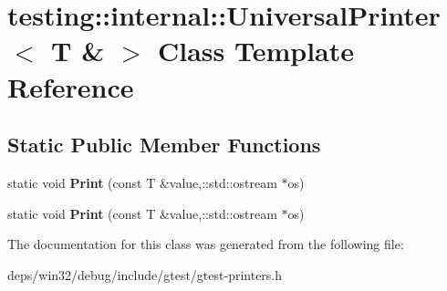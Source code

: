 \hypertarget{classtesting_1_1internal_1_1_universal_printer_3_01_t_01_6_01_4}{}\section{testing\+:\+:internal\+:\+:Universal\+Printer$<$ T \& $>$ Class Template Reference}
\label{classtesting_1_1internal_1_1_universal_printer_3_01_t_01_6_01_4}
\subsection*{Static Public Member Functions}
\begin{DoxyCompactItemize}
\item 
\hypertarget{classtesting_1_1internal_1_1_universal_printer_3_01_t_01_6_01_4_a2a63ddb20294c4234b7e8f3c7a56355d}{}static void {\bfseries Print} (const T \&value,\+::std\+::ostream $\ast$os)\label{classtesting_1_1internal_1_1_universal_printer_3_01_t_01_6_01_4_a2a63ddb20294c4234b7e8f3c7a56355d}

\item 
\hypertarget{classtesting_1_1internal_1_1_universal_printer_3_01_t_01_6_01_4_a2a63ddb20294c4234b7e8f3c7a56355d}{}static void {\bfseries Print} (const T \&value,\+::std\+::ostream $\ast$os)\label{classtesting_1_1internal_1_1_universal_printer_3_01_t_01_6_01_4_a2a63ddb20294c4234b7e8f3c7a56355d}

\end{DoxyCompactItemize}


The documentation for this class was generated from the following file\+:\begin{DoxyCompactItemize}
\item 
deps/win32/debug/include/gtest/gtest-\/printers.\+h\end{DoxyCompactItemize}
